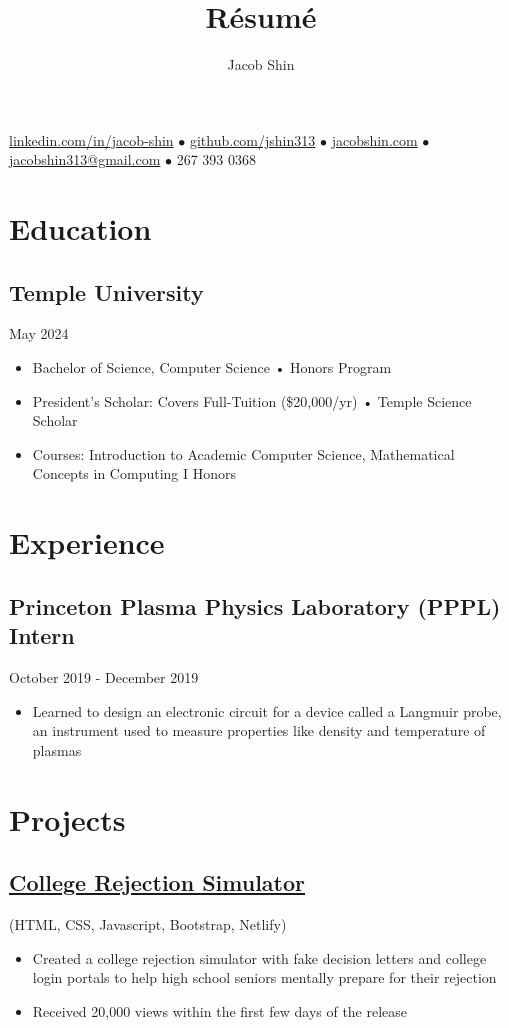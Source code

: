 \documentclass{article}
\makeatletter
\renewcommand{\maketitle}{
    \begin{center}
        {\huge\bfseries
        \theauthor}
    \end{center}
    \begin{center}
        \vspace{1em}
        \leavevmode
        \href{https://linkedin.com/in/jacob-shin}{linkedin.com/in/jacob-shin} $\bullet$ \href{https://github.com/jshin313}{github.com/jshin313} $\bullet$ \href{https://jacobshin.com}{jacobshin.com} $\bullet$ \href{jacobshin313@gmail.com}{jacobshin313@gmail.com} $\bullet$ 267 393 0368
    \end{center}
}
\makeatother
\begin{document}
\title{R\'esum\'e}
\author{Jacob Shin}

\maketitle
\section{Education}
\subsection{Temple University}\hspace{33em}May 2024
\begin{itemize}
    \item Bachelor of Science, Computer Science • Honors Program
    \item President's Scholar: Covers Full-Tuition (\$20,000/yr) • Temple Science Scholar
    \item Courses: Introduction to Academic Computer Science, Mathematical Concepts in Computing I Honors 
\end{itemize}

\section{Experience}
\subsection{Princeton Plasma Physics Laboratory (PPPL) Intern}\hspace{7em}October 2019 - December 2019
\begin{itemize}
    \item Learned to design an electronic circuit for a device called a Langmuir probe, an instrument used to measure properties like density and temperature of plasmas
\end{itemize}

\section{Projects}
\subsection{\href{https://ivyhub.org/decision-letters/}{\underline{College Rejection Simulator}}} (HTML, CSS, Javascript, Bootstrap, Netlify)
\begin{itemize}
    \item Created a college rejection simulator with fake decision letters and college login portals to help high school seniors mentally prepare for their rejection
    \item Received 20,000 views within the first few days of the release
\end{itemize}
\end{document}
